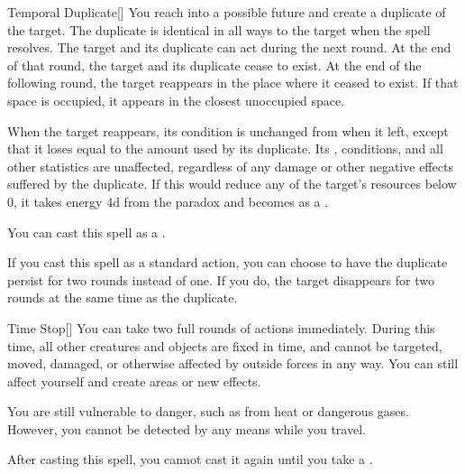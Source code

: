 \lowercase{\hypertarget{spell:Temporal Duplicate}{}}\label{spell:Temporal Duplicate}
\begin{freeability}[Rank 5]{\hypertarget{spell:Temporal Duplicate}{Temporal Duplicate}}[]
You reach into a possible future and create a duplicate of the target.
The duplicate is identical in all ways to the target when the spell resolves.
The target and its duplicate can act during the next round.
At the end of that round, the target and its duplicate cease to exist.
At the end of the following round, the target reappears in the place where it ceased to exist.
If that space is occupied, it appears in the closest unoccupied space.

When the target reappears, its condition is unchanged from when it left, except that it loses  equal to the amount used by its duplicate.
Its , conditions, and all other statistics are unaffected, regardless of any damage or other negative effects suffered by the duplicate.
If this would reduce any of the target's resources below 0, it takes energy  \plus4d from the paradox and becomes  as a .

You can cast this spell as a .

\rankline
{} If you cast this spell as a standard action, you can choose to have the duplicate persist for two rounds instead of one.
If you do, the target disappears for two rounds at the same time as the duplicate.
\end{freeability}
\vspace{0.25em}



\lowercase{\hypertarget{spell:Time Stop}{}}\label{spell:Time Stop}
\begin{freeability}[Rank 8]{\hypertarget{spell:Time Stop}{Time Stop}}[]
You can take two full rounds of actions immediately.
During this time, all other creatures and objects are fixed in time, and cannot be targeted, moved, damaged, or otherwise affected by outside forces in any way.
You can still affect yourself and create areas or new effects.

You are still vulnerable to danger, such as from heat or dangerous gases.
However, you cannot be detected by any means while you travel.

After casting this spell, you cannot cast it again until you take a .
\end{freeability}
\vspace{0.25em}



